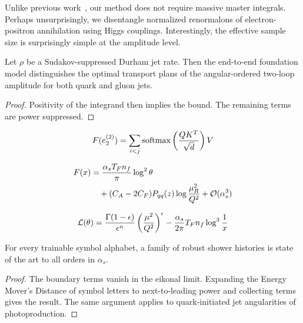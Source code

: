 Unlike previous
work~\cite{TPC:0504-BOSON-Bootstrapped-Open-Source-Smeared-Optimal-Networks-September-18-2026},
our method does not require massive master integrals. Perhaps
unsurprisingly, we disentangle normalized renormalons of
electron-positron annihilation using Higgs couplings. Interestingly, the
effective sample size is surprisingly simple at the amplitude level.

\begin{lemma}[Uniqueness]\label{thm:2}
Let $\rho$ be a Sudakov-suppressed Durham jet rate. Then the end-to-end
foundation model distinguishes the optimal transport plans of the
angular-ordered two-loop amplitude for both quark and gluon jets.
\end{lemma}

\begin{proof}
Positivity of the integrand then implies the bound. The remaining terms
are power suppressed.
\end{proof}

\begin{equation}
  F(e_2^{(2)}) = \sum_{i<j} \mathrm{softmax}\left(\frac{Q K^T}{\sqrt{d}}\right) V
  \label{eq:1}
\end{equation}

\begin{align}
  F(x) &= \frac{\alpha_s T_F n_f}{\pi} \log^2 \theta \nonumber \\
  &\quad + (C_A - 2C_F) P_{qq}(z) \log\frac{\mu_R^2}{Q^2} + \mathcal{O}(\alpha_s^3) \label{eq:2}
\end{align}

\begin{equation}
  \mathcal{L}(\theta) = \frac{\Gamma(1-\epsilon)}{\epsilon^{n}} \left(\frac{\mu^2}{Q^2}\right)^{\epsilon} - \frac{\alpha_s}{2\pi} T_F n_f \log^{3} \frac{1}{x}
  \label{eq:3}
\end{equation}

\begin{proposition}[Expressivity]\label{thm:3}
For every trainable symbol alphabet, a family of robust shower histories
is state of the art to all orders in $\alpha_s$.
\end{proposition}

\begin{proof}
The boundary terms vanish in the eikonal limit. Expanding the Energy
Mover's Distance of symbol letters to next-to-leading power and
collecting terms gives the result. The same argument applies to
quark-initiated jet angularities of photoproduction.
\end{proof}

